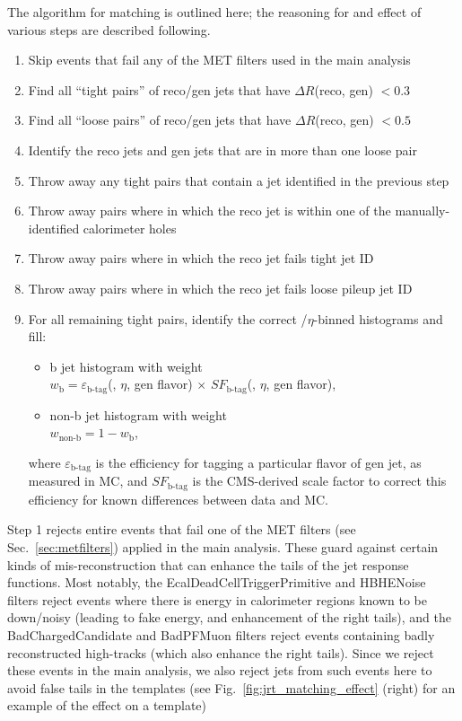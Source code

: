 The algorithm for matching is outlined here; the reasoning for and effect of various steps are described following.
\begin{enumerate}\setlength\itemsep{-0.3mm}
\item Skip events that fail any of the MET filters used in the main analysis
\item Find all ``tight pairs'' of reco/gen jets that have $\Delta R$(reco, gen) $<0.3$
\item Find all ``loose pairs'' of reco/gen jets that have $\Delta R$(reco, gen) $<0.5$
\item Identify the reco jets and gen jets that are in more than one loose pair
\item Throw away any tight pairs that contain a jet identified in the previous step
\item Throw away pairs where in which the reco jet is within one of the manually-identified calorimeter holes
\item Throw away pairs where in which the reco jet fails tight jet ID
\item Throw away pairs where in which the reco jet fails loose pileup jet ID
\item For all remaining tight pairs, identify the correct \pt/$\eta$-binned histograms and fill:
  \begin{itemize}
    \item b jet histogram with weight \\
    \hphantom{1 cm}$w_\text{b}=\varepsilon_\text{b-tag}$(\pt, $\eta$, gen flavor) $\times$ $SF_\text{b-tag}$(\pt, $\eta$, gen flavor),
    \item non-b jet histogram with weight \\
    \hphantom{1 cm}$w_\text{non-b} = 1-w_\text{b}$,
  \end{itemize}
  where $\varepsilon_\text{b-tag}$ is the efficiency for tagging a particular flavor of gen jet, as measured in MC, and $SF_\text{b-tag}$ is 
  the CMS-derived scale factor to correct this efficiency for known differences between data and MC.
\end{enumerate}

Step 1 rejects entire events that fail one of the MET filters (see Sec.~\ref{sec:metfilters}) applied in the main analysis.
These guard against certain kinds of mis-reconstruction that can enhance the tails of the
jet response functions. Most notably, the EcalDeadCellTriggerPrimitive and HBHENoise filters
reject events where there is energy in calorimeter regions known to be down/noisy (leading to 
fake energy, and enhancement of the right tails), and the BadChargedCandidate and BadPFMuon
filters reject events containing badly reconstructed high-\pt tracks (which also enhance
the right tails). Since we reject these events in the main analysis, we also reject
jets from such events here to avoid false tails in the templates 
(see Fig.~\ref{fig:jrt_matching_effect} (right) for an example of the effect on a template)

